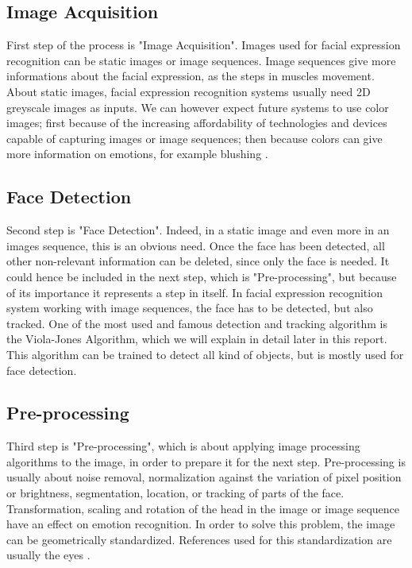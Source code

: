 \subsection{Image Acquisition}

\vspace{\baselineskip}
\noindent First step of the process is "Image Acquisition". Images used for facial expression recognition can be static images or image sequences. Image sequences give more informations about the facial expression, as the steps in muscles movement. About static images, facial expression recognition systems usually need 2D greyscale images as inputs. We can however expect future systems to use color images; first because of the increasing affordability of technologies and devices capable of capturing images or image sequences; then because colors can give more information on emotions, for example blushing \cite{CHI03}.
\newline

\subsection{Face Detection}

\vspace{\baselineskip}
\noindent Second step is "Face Detection". Indeed, in a static image and even more in an images sequence, this is an obvious need. Once the face has been detected, all other non-relevant information can be deleted, since only the face is needed. It could hence be included in the next step, which is "Pre-processing", but because of its importance it represents a step in itself. In facial expression recognition system working with image sequences, the face has to be detected, but also tracked. One of the most used and famous detection and tracking algorithm is the Viola-Jones Algorithm, which we will explain in detail later in this report. This algorithm can be trained to detect all kind of objects, but is mostly used for face detection.
\newline

\subsection{Pre-processing}

\vspace{\baselineskip}
\noindent Third step is "Pre-processing", which is about applying image processing algorithms to the image, in order to prepare it for the next step. Pre-processing is usually about noise removal, normalization against the variation of pixel position or brightness, segmentation, location, or tracking of parts of the face. Transformation, scaling and rotation of the head in the image or image sequence have an effect on emotion recognition. In order to solve this problem, the image can be geometrically standardized. References used for this standardization are usually the eyes \cite{CHI03}.
\newline

